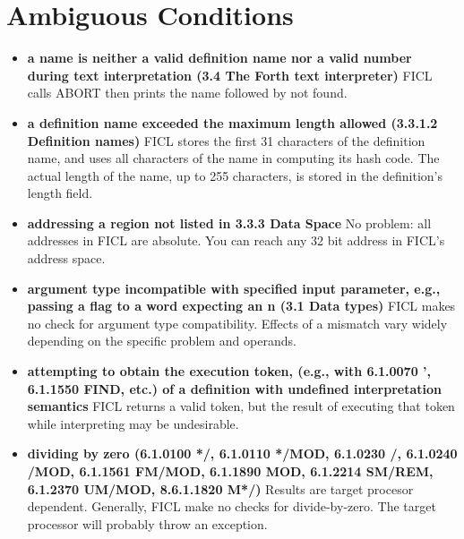 \section{Ambiguous Conditions}
\begin{itemize}[noitemsep]
	\item \textbf{a name is neither a valid definition name nor a
		valid number during text interpretation (3.4 The Forth
		text interpreter)}\newline
	FICL calls ABORT then prints the name followed by not found.

	\item \textbf{a definition name exceeded the maximum length
		allowed (3.3.1.2 Definition names)}\newline
	FICL stores the first 31 characters of the definition name, and
	uses all characters of the name in computing its hash code. The
	actual length of the name, up to 255 characters, is stored in
	the definition's length field.

	\item \textbf{addressing a region not listed in 3.3.3 Data
		Space}\newline
	No problem: all addresses in FICL are absolute. You can reach
	any 32 bit address in FICL's address space.

	\item \textbf{argument type incompatible with specified input
		parameter, e.g., passing a flag to a word expecting an
		n (3.1 Data types)}\newline
	FICL makes no check for argument type compatibility. Effects of
	a mismatch vary widely depending on the specific problem and
	operands.

	\item \textbf{attempting to obtain the execution token, (e.g.,
		with 6.1.0070 ', 6.1.1550 FIND, etc.) of a definition
		with undefined interpretation semantics}\newline
	FICL returns a valid token, but the result of executing that
	token while interpreting may be undesirable.

	\item \textbf{dividing by zero (6.1.0100 */, 6.1.0110 */MOD,
		6.1.0230 /, 6.1.0240 /MOD, 6.1.1561 FM/MOD, 6.1.1890
		MOD, 6.1.2214 SM/REM, 6.1.2370 UM/MOD, 8.6.1.1820
		M*/)}\newline
	Results are target procesor dependent. Generally, FICL make no
	checks for divide-by-zero. The target processor will probably
	throw an exception.


\end{itemize}
